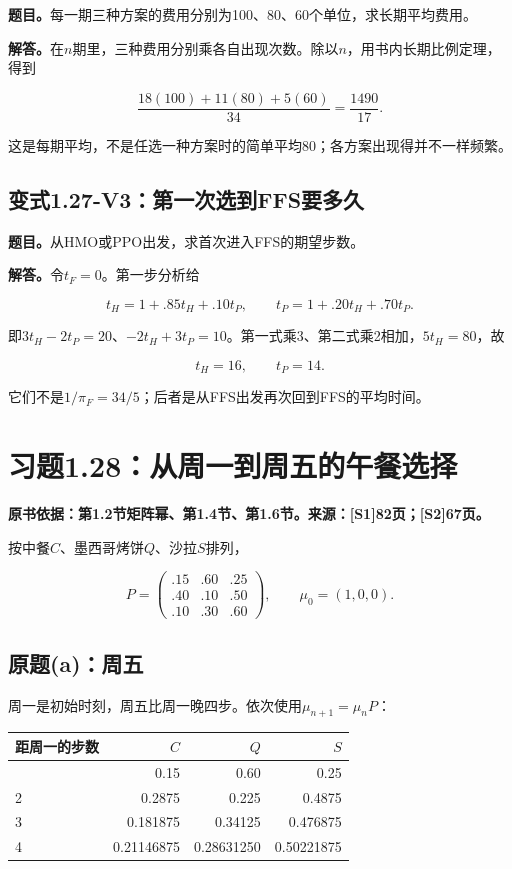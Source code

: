 \documentclass[
  11pt,
  a4paper,
  UTF8,
  fontset=fandol]{ctexart}
\begin{document}
\textbf{题目。}每一期三种方案的费用分别为100、80、60个单位，求长期平均费用。

\textbf{解答。}在\(n\)期里，三种费用分别乘各自出现次数。除以\(n\)，用书内长期比例定理，得到

\[
\frac{18(100)+11(80)+5(60)}{34}
=\boxed{\frac{1490}{17}}.
\]

这是每期平均，不是任选一种方案时的简单平均80；各方案出现得并不一样频繁。

\subsection{变式1.27-V3：第一次选到FFS要多久}\label{ux53d8ux5f0f1.27-v3ux7b2cux4e00ux6b21ux9009ux5230ffsux8981ux591aux4e45}

\textbf{题目。}从HMO或PPO出发，求首次进入FFS的期望步数。

\textbf{解答。}令\(t_F=0\)。第一步分析给

\[
t_H=1+.85t_H+.10t_P,\qquad
t_P=1+.20t_H+.70t_P.
\]

即\(3t_H-2t_P=20\)、\(-2t_H+3t_P=10\)。第一式乘3、第二式乘2相加，\(5t_H=80\)，故

\[
\boxed{t_H=16,\qquad t_P=14.}
\]

它们不是\(1/\pi_F=34/5\)；后者是从FFS出发再次回到FFS的平均时间。

\section{习题1.28：从周一到周五的午餐选择}\label{ux4e60ux98981.28ux4eceux5468ux4e00ux5230ux5468ux4e94ux7684ux5348ux9910ux9009ux62e9}

\textbf{原书依据：第1.2节矩阵幂、第1.4节、第1.6节。来源：{[}S1{]}82页；{[}S2{]}67页。}

按中餐\(C\)、墨西哥烤饼\(Q\)、沙拉\(S\)排列，

\[
P=\begin{pmatrix}.15&.60&.25\\.40&.10&.50\\.10&.30&.60\end{pmatrix},
\qquad\mu_0=(1,0,0).
\]

\subsection{原题(a)：周五}\label{ux539fux9898aux5468ux4e94}

周一是初始时刻，周五比周一晚四步。依次使用\(\mu_{n+1}=\mu_nP\)：

\begin{longtable}[]{@{}lrrr@{}}
\toprule\noalign{}
距周一的步数 & \(C\) & \(Q\) & \(S\) \\
\midrule\noalign{}
\endhead
\bottomrule\noalign{}
\endlastfoot
1 & 0.15 & 0.60 & 0.25 \\
2 & 0.2875 & 0.225 & 0.4875 \\
3 & 0.181875 & 0.34125 & 0.476875 \\
4 & 0.21146875 & 0.28631250 & 0.50221875 \\
\end{longtable}
\end{document}
